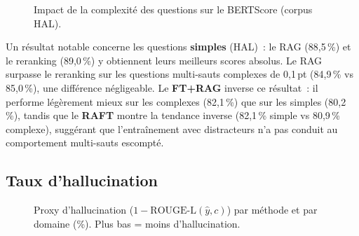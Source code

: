 \documentclass[10pt,journal,compsoc]{IEEEtran}
\begin{document}
\begin{figure}[H]
  \centering
  \caption{Impact de la complexité des questions sur le BERTScore
           (corpus HAL).}
  \label{fig:multisauts}
\end{figure}

Un résultat notable concerne les questions \textbf{simples} (HAL)~:
le RAG (88,5\,\%) et le reranking (89,0\,\%) y obtiennent leurs
meilleurs scores absolus. Le RAG surpasse le reranking sur les
questions multi-sauts complexes de 0,1\,pt (84,9\,\% vs 85,0\,\%),
une différence négligeable. Le \textbf{FT+RAG} inverse ce résultat~:
il performe légèrement mieux sur les complexes (82,1\,\%) que sur
les simples (80,2\,\%), tandis que le \textbf{RAFT} montre la
tendance inverse (82,1\,\% simple vs 80,9\,\% complexe), suggérant
que l'entraînement avec distracteurs n'a pas conduit au comportement
multi-sauts escompté.

\subsection{Taux d'hallucination}

\begin{figure}[H]
  \centering
  \caption{Proxy d'hallucination ($1 - \text{ROUGE-L}(\hat{y}, c)$) par
           méthode et par domaine (\%). Plus bas = moins d'hallucination.}
  \label{fig:hallucination}
\end{figure}
\end{document}
